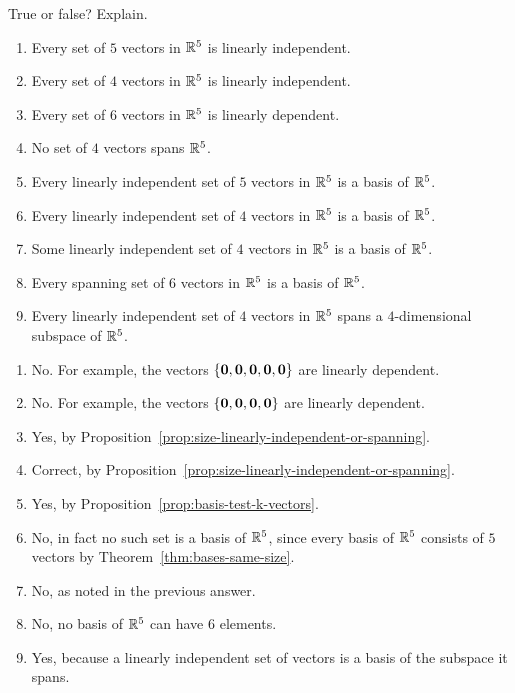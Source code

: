 \begin{ex}
  True or false? Explain.
  \begin{enumerate}
  \item Every set of $5$ vectors in $\mathbb{R}^{5}$ is linearly independent.
  \item Every set of $4$ vectors in $\mathbb{R}^{5}$ is linearly independent.
  \item Every set of $6$ vectors in $\mathbb{R}^{5}$ is linearly dependent.
  \item No set of $4$ vectors spans $\mathbb{R}^{5}$.
  \item Every linearly independent set of $5$ vectors in $\mathbb{R}^5$ is a
    basis of $\mathbb{R}^5$.
  \item Every linearly independent set of $4$ vectors in $\mathbb{R}^5$ is a
    basis of $\mathbb{R}^5$.
  \item Some linearly independent set of $4$ vectors in $\mathbb{R}^5$ is a
    basis of $\mathbb{R}^5$.
  \item Every spanning set of $6$ vectors in $\mathbb{R}^5$ is a basis of
    $\mathbb{R}^5$.
  \item Every linearly independent set of $4$ vectors in $\mathbb{R}^5$ spans
    a $4$-dimensional subspace of $\mathbb{R}^5$.
  \end{enumerate}
  \begin{sol}
    \begin{enumerate}
    \item No. For example, the vectors
      $\left\{\mbox{\bf 0},\mbox{\bf 0},\mbox{\bf 0},\mbox{\bf 0},\mbox{\bf 0}\right\}$ are
      linearly dependent.
    \item No. For example, the vectors
      $\left\{\mbox{\bf 0},\mbox{\bf 0},\mbox{\bf 0},\mbox{\bf 0}\right\}$ are linearly
      dependent.
    \item Yes, by Proposition~\ref{prop:size-linearly-independent-or-spanning}.
    \item Correct, by Proposition~\ref{prop:size-linearly-independent-or-spanning}.
    \item Yes, by Proposition~\ref{prop:basis-test-k-vectors}.
    \item No, in fact no such set is a basis of $\mathbb{R}^5$, since every
      basis of $\mathbb{R}^5$ consists of $5$ vectors by
      Theorem~\ref{thm:bases-same-size}.
    \item No, as noted in the previous answer.
    \item No, no basis of $\mathbb{R}^5$ can have $6$ elements.
    \item Yes, because a linearly independent set of vectors is a
      basis of the subspace it spans.
    \end{enumerate}
  \end{sol}
\end{ex}

